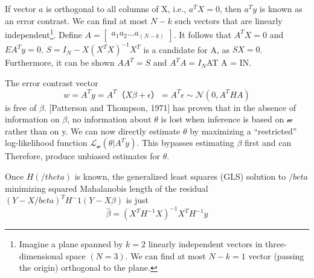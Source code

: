 \documentclass[a4paper,11pt]{article}
\begin{document}
If vector $a$ is orthogonal to all columns of X, i.e., $a^T X = 0 $, then $a^T y$ is known as an error contrast. We can find at most $N-k$ such vectors that are linearly independent\footnote{ Imagine a plane spanned by $k = 2$ linearly independent vectors in three-dimensional space $(N = 3)$. We can find at most $N - k = 1$ vector (passing the origin) orthogonal to the plane.}. Define $A =\begin{bmatrix} a_1 a_2 ... a_(N-k) \end{bmatrix}$. It follows that $A^T X = 0$ and $E{A^T y} = 0$. $S = I_N - X(X^T X)^{-1} X^T $ is a candidate for A, as $SX = 0$. Furthermore, it can be shown $A A^T = S$ and $A^T A = I_N$AT A = IN.

The error contrast vector 
\begin{equation}\label{eq1} 
         w = A^T y = A^T（X \beta + \epsilon）= A^T \epsilon \sim \mathcal{N}(0,A^T H A)
\end{equation}
 is free of $\beta$. [Patterson and Thompson, 1971] has proven that in the absence of information on $\beta$, no information about $\theta$ is lost when inference is based on $\mathcal{w}$ rather than on y. We can now directly estimate $\theta$ by maximizing a “restricted” log-likelihood function $\mathcal{L_w}(\theta| A^T y)$. This bypasses estimating $\beta$ first and can Therefore, produce unbiased estimates for $\theta$.

Once $H(/theta)$ is known, the generalized least squares (GLS) solution to $/beta$ minimizing squared Mahalanobis length of the residual $(Y - X/beta)^T H^-1(Y - X\beta)$ is just
\begin{equation}\label{eq:mean} 
         \widehat{\beta} = (X^T H^{-1} X)^{-1} X^T H^{-1} y
\end{equation}
\end{document}
